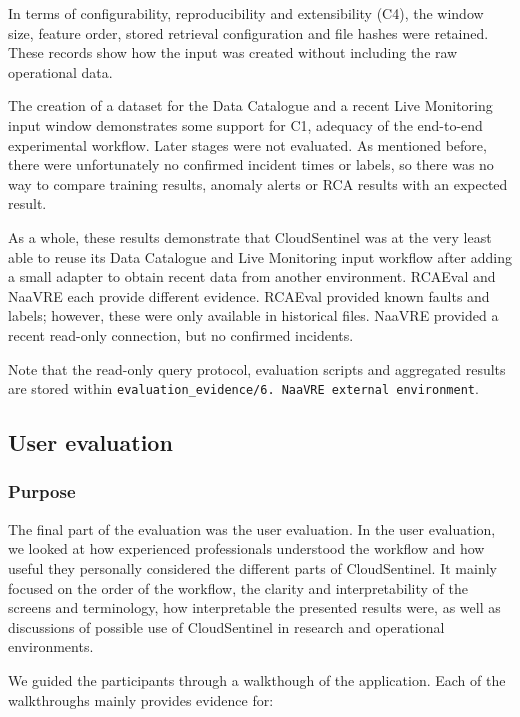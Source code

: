 In terms of configurability, reproducibility and extensibility (C4), the window size, feature order, stored retrieval configuration and file hashes were retained. These records show how the input was created without including the raw operational data.

The creation of a dataset for the Data Catalogue and a recent Live Monitoring input window demonstrates some support for C1, adequacy of the end-to-end experimental workflow. Later stages were not evaluated. As mentioned before, there were unfortunately no confirmed incident times or labels, so there was no way to compare training results, anomaly alerts or RCA results with an expected result.

As a whole, these results demonstrate that CloudSentinel was at the very least able to reuse its Data Catalogue and Live Monitoring input workflow after adding a small adapter to obtain recent data from another environment. RCAEval and NaaVRE each provide different evidence. RCAEval provided known faults and labels; however, these were only available in historical files. NaaVRE provided a recent read-only connection, but no confirmed incidents.

Note that the read-only query protocol, evaluation scripts and aggregated results are stored within \texttt{evaluation\_evidence/6. NaaVRE external environment}.

\subsection{User evaluation}

\subsubsection{Purpose}

The final part of the evaluation was the user evaluation. In the user evaluation, we looked at how experienced professionals understood the workflow and how useful they personally considered the different parts of CloudSentinel. It mainly focused on the order of the workflow, the clarity and interpretability of the screens and terminology, how interpretable the presented results were, as well as discussions of possible use of CloudSentinel in research and operational environments.

We guided the participants through a walkthough of the application. Each of the walkthroughs mainly provides evidence for:

